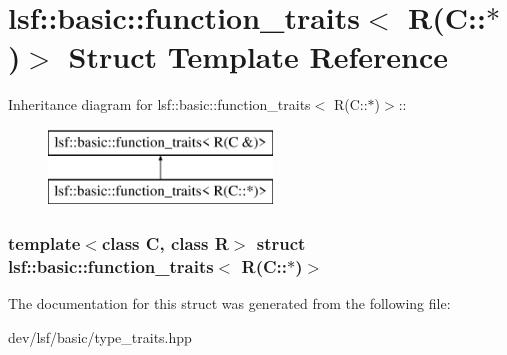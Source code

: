 \hypertarget{structlsf_1_1basic_1_1function__traits_3_01R_07C_1_1_5_08_4}{
\section{lsf::basic::function\_\-traits$<$ R(C::$\ast$)$>$ Struct Template Reference}
\label{structlsf_1_1basic_1_1function__traits_3_01R_07C_1_1_5_08_4}
}
Inheritance diagram for lsf::basic::function\_\-traits$<$ R(C::$\ast$)$>$::\begin{figure}[H]
\begin{center}
\leavevmode
\includegraphics[height=2cm]{structlsf_1_1basic_1_1function__traits_3_01R_07C_1_1_5_08_4}
\end{center}
\end{figure}
\subsubsection*{template$<$class C, class R$>$ struct lsf::basic::function\_\-traits$<$ R(C::$\ast$)$>$}



The documentation for this struct was generated from the following file:\begin{DoxyCompactItemize}
\item 
dev/lsf/basic/type\_\-traits.hpp\end{DoxyCompactItemize}
